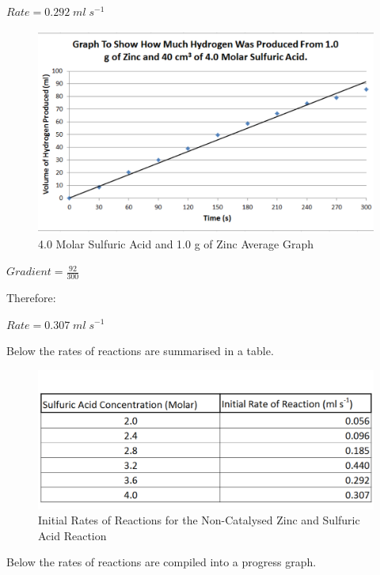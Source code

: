 $Rate = 0.292 \; ml \; s^{-1}$

\begin{figure}[H]
    \includegraphics[width=\textwidth]{./Analysis/Images/1NonCatalyst/40Molar.pdf}
    \caption{4.0 Molar Sulfuric Acid and 1.0 g of Zinc Average Graph} \label{fig:40MolarSAGradient}
\end{figure}

$Gradient = \frac{92}{300}$

Therefore:

$Rate = 0.307 \; ml \; s^{-1}$

Below the rates of reactions are summarised in a table.

\begin{figure}[H]
    \includegraphics[width=\textwidth]{./Analysis/Images/1NonCatalyst/Rates.pdf}
    \caption{Initial Rates of Reactions for the Non-Catalysed Zinc and Sulfuric Acid Reaction} \label{fig:RatesSA}
\end{figure}

Below the rates of reactions are compiled into a progress graph.

